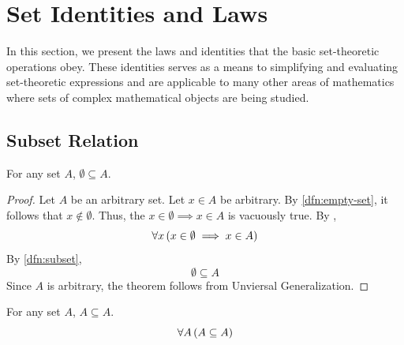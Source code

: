 \newpage
\section{Set Identities and Laws}
In this section, we present the laws and identities that the basic set-theoretic operations
obey. These identities serves as a means to simplifying and evaluating set-theoretic expressions
and are applicable to many other areas of mathematics where sets of complex mathematical objects
are being studied.

\subsection{Subset Relation}
\begin{thm}
    \label{thm:empty-set-universal-subset}
    For any set \( A \), \( \emptyset \subseteq A \).
\end{thm}

\begin{proof}
    Let \( A \) be an arbitrary set. Let \( x \in A \) be arbitrary. By \cref{dfn:empty-set},
    it follows that \( x \notin \emptyset \). Thus, the \( x \in \emptyset {\implies} x \in A \)
    is vacuously true. By ,
    \begin{equation*}
        \forall x \, \mleft( x \in \emptyset \implies x \in A \mright)
    \end{equation*}
    By \cref{dfn:subset},
    \begin{equation*}
        \emptyset \subseteq A
    \end{equation*}
    Since \( A \) is arbitrary, the theorem follows from Unviersal Generalization.
\end{proof}

\begin{thm}
    \label{thm:every-set-is-subset-of-itself}
    For any set \( A \), \( A \subseteq A \).
    \begin{equation*}
        \forall A \, \mleft( A \subseteq A \mright)
    \end{equation*}
\end{thm}

